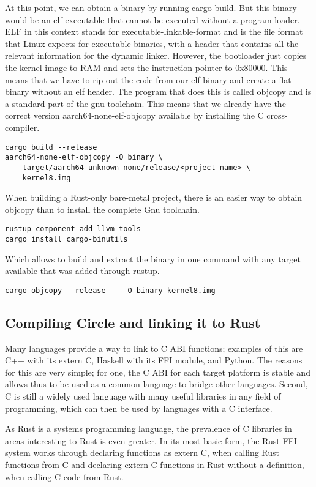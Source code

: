 At this point, we can obtain a binary by running cargo build.
But this binary would be an elf executable that cannot be executed without a program loader.
ELF in this context stands for executable-linkable-format and is the file format that Linux expects for executable binaries,
with a header that contains all the relevant information for the dynamic linker.
However, the bootloader just copies the kernel image to RAM and sets the instruction pointer to 0x80000.
This means that we have to rip out the code from our elf binary and create a flat binary without an elf header.
The program that does this is called objcopy and is a standard part of the gnu toolchain.
This means that we already have the correct version aarch64-none-elf-objcopy available by installing the C cross-compiler.

\begin{verbatim}
cargo build --release
aarch64-none-elf-objcopy -O binary \
    target/aarch64-unknown-none/release/<project-name> \
    kernel8.img
\end{verbatim}

When building a Rust-only bare-metal project, there is an easier way to obtain objcopy than to install the complete Gnu toolchain.
\begin{verbatim}
rustup component add llvm-tools
cargo install cargo-binutils
\end{verbatim}
Which allows to build and extract the binary in one command with any target available that was added through rustup.
\begin{verbatim}
cargo objcopy --release -- -O binary kernel8.img
\end{verbatim}

\subsection{Compiling Circle and linking it to Rust}
\label{sec:concept_and_implementation:bare-metal:ffi}

Many languages provide a way to link to C ABI functions; examples of this are C++ with its extern C, Haskell with its FFI module, and Python.
The reasons for this are very simple; for one, the C ABI for each target platform is stable and allows thus to be used as a common language to bridge other languages.
Second, C is still a widely used language with many useful libraries in any field of programming, which can then be used by languages with a C interface.

As Rust is a systems programming language, the prevalence of C libraries in areas interesting to Rust is even greater.
In its most basic form, the Rust FFI system works through declaring functions as extern C, when calling Rust functions from C
and declaring extern C functions in Rust without a definition, when calling C code from Rust.

